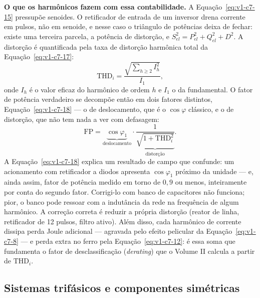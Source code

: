 \documentclass[12pt,a4paper]{article}
\numberwithin{equation}{section}
\numberwithin{table}{section}
\numberwithin{figure}{section}
\begin{document}
\textbf{O que os harmônicos fazem com essa contabilidade.} A
Equação~\eqref{eq:v1-c7-15} pressupõe senoides. O retificador de entrada de um
inversor drena corrente em pulsos, não em senoide, e nesse caso o triângulo de
potências deixa de fechar: existe uma terceira parcela, a potência de
distorção, e $S_{el}^2 = P_{el}^2 + Q_{el}^2 + D^2$. A distorção é quantificada
pela taxa de distorção harmônica total da Equação~\eqref{eq:v1-c7-17}:
\begin{equation}\label{eq:v1-c7-17}
\mathrm{THD}_i = \frac{\sqrt{\sum_{h\geq2} I_h^2}}{I_1},
\end{equation}
onde $I_h$ é o valor eficaz do harmônico de ordem $h$ e $I_1$ o da fundamental.
O fator de potência verdadeiro se decompõe então em dois fatores distintos,
Equação~\eqref{eq:v1-c7-18} --- o de deslocamento, que é o $\cos\varphi$
clássico, e o de distorção, que não tem nada a ver com defasagem:
\begin{equation}\label{eq:v1-c7-18}
\mathrm{FP} = \underbrace{\cos\varphi_1}_{\text{deslocamento}}\cdot
\underbrace{\frac{1}{\sqrt{1+\mathrm{THD}_i^{2}}}}_{\text{distorção}} .
\end{equation}
A Equação~\eqref{eq:v1-c7-18} explica um resultado de campo que confunde:
um acionamento com retificador a diodos apresenta $\cos\varphi_1$ próximo da
unidade --- e, ainda assim, fator de potência medido em torno de $0{,}9$ ou
menos, inteiramente por conta do segundo fator. Corrigi-lo com banco de
capacitores não funciona; pior, o banco pode ressoar com a indutância da rede
na frequência de algum harmônico. A correção correta é reduzir a própria
distorção (reator de linha, retificador de 12 pulsos, filtro ativo). Além
disso, cada harmônico de corrente dissipa perda Joule adicional --- agravada
pelo efeito pelicular da Equação~\eqref{eq:v1-c7-8} --- e perda extra no ferro
pela Equação~\eqref{eq:v1-c7-12}: é essa soma que fundamenta o fator de
desclassificação (\textit{derating}) que o Volume II calcula a partir de
$\mathrm{THD}_i$.

\subsection{Sistemas trifásicos e componentes
simétricas}\label{sub:v1-c7-trifasico}
\end{document}
